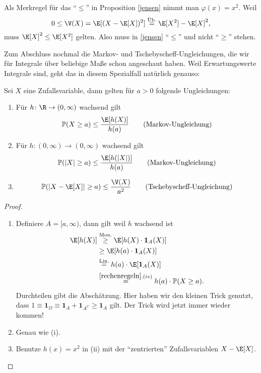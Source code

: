 \begin{beispiel1}
	Als Merkregel für das \enquote{$\leq$} in Proposition \ref{jensen} nimmt man $\varphi(x)=x^2$. Weil
	\[ 0 \leq \V(X) = \E[(X - \E[X])^2] \overset{\text{Üb.}}{=} \E[X^2] - \E[X]^2,
	\]
	muss $\E[X]^2\leq \E[X^2]$ gelten. Also muss in \ref{jensen} \enquote{$\leq$} und nicht \enquote{$\geq$} stehen.
\end{beispiel1}
Zum Abschluss nochmal die Markov- und Tschebyscheff-Ungleichungen, die wir f\"ur Integrale \"uber beliebige Ma\ss e schon angeschaut haben. Weil Erwartungswerte Integrale sind, geht das in diesem Spezialfall nat\"urlich genauso:
\begin{satz}\label{Markov}
	Sei $X$ eine Zufallsvariable, dann gelten für $a > 0$ folgende Ungleichungen:
	\begin{enumerate}[label=(\roman*)]
		\item F\"ur $h \colon \R \to (0, \infty)$ wachsend gilt
		 \[ \mathbb{P}(X\geq a) \leq \frac{\E[h(X)]}{h(a)} \quad\quad \text{(Markov-Ungleichung)} \]
		\item F\"ur $h \colon (0,\infty) \to (0, \infty)$ wachsend gilt		
		 \[ \mathbb{P}(|X|\geq a) \leq \frac{\E[h(|X|)]}{h(a)} \quad\quad \text{(Markov-Ungleichung)} \]
		\item \[ \mathbb{P}(|X - \E[X]| \geq  a) \leq \frac{\V(X)}{a^2} \quad\quad \text{(Tschebyscheff-Ungleichung)} \]
	\end{enumerate}
\end{satz}

\begin{proof}\abs
	\begin{enumerate}[label=(\roman*)]
		\item \label{itscheby} Definiere $A = [a, \infty)$, dann gilt weil $h$ wachsend ist
		\begin{align*}
		\E[h(X)]& \overset{\text{Mon.}}{\geq} \E[h(X) \cdot \mathbf{1}_A(X)] \\
		&\geq \E[h(a) \cdot \mathbf{1}_A(X)]\\
		& \overset{\text{Lin.}}{=} h(a) \cdot \E[\mathbf{1}_A(X)]\\
		&\overset{\ref{rechenregeln}, (iv)}{=} h(a) \cdot \mathbb{P}(X\geq a).
		\end{align*}
		Durchteilen gibt die Absch\"atzung. Hier haben wir den kleinen Trick genutzt, dass $1\equiv \mathbf 1_{\Omega}\equiv \mathbf 1_A+\mathbf 1_{A^C}\geq \mathbf 1_A$ gilt. Der Trick wird jetzt immer wieder kommen!
		\item Genau wie (i).
		\item Benutze $h(x) = x^2$ in (ii) mit der \enquote{zentrierten} Zufallsvariablen $X - \E[X]$.
	\end{enumerate}
\end{proof}

